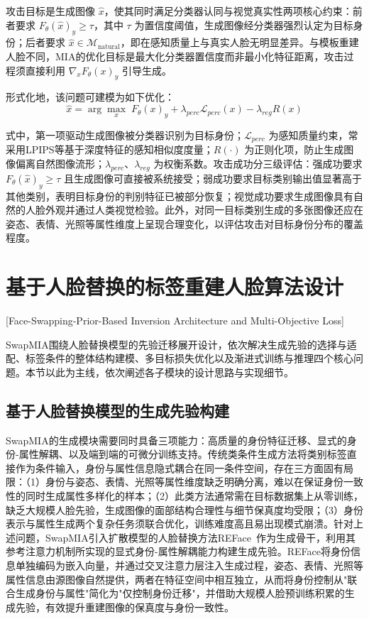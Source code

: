 攻击目标是生成图像 $\hat{x}$，使其同时满足分类器认同与视觉真实性两项核心约束：前者要求 $F_\theta(\hat{x})_y \geq \tau$，其中 $\tau$ 为置信度阈值，生成图像经分类器强烈认定为目标身份；后者要求 $\hat{x} \in \mathcal{M}_{\text{natural}}$，即在感知质量上与真实人脸无明显差异。与模板重建人脸不同，MIA的优化目标是最大化分类器置信度而非最小化特征距离，攻击过程须直接利用 $\nabla_x F_\theta(x)_y$ 引导生成。

形式化地，该问题可建模为如下优化：
\begin{equation}\label{eq:mia_optimization}
\hat{x} = \arg\max_x \; F_\theta(x)_y + \lambda_{perc}\mathcal{L}_{perc}(x) - \lambda_{reg}R(x)
\end{equation}

式中，第一项驱动生成图像被分类器识别为目标身份；$\mathcal{L}_{perc}$ 为感知质量约束，常采用LPIPS\cite{zhang2018unreasonable}等基于深度特征的感知相似度度量；$R(\cdot)$ 为正则化项，防止生成图像偏离自然图像流形；$\lambda_{perc}$、$\lambda_{reg}$ 为权衡系数。攻击成功分三级评估：强成功要求 $F_\theta(\hat{x})_y \geq \tau$ 且生成图像可直接被系统接受；弱成功要求目标类别输出值显著高于其他类别，表明目标身份的判别特征已被部分恢复；视觉成功要求生成图像具有自然的人脸外观并通过人类视觉检验。此外，对同一目标类别生成的多张图像还应在姿态、表情、光照等属性维度上呈现合理变化，以评估攻击对目标身份分布的覆盖程度。

\section{基于人脸替换的标签重建人脸算法设计}[Face-Swapping-Prior-Based Inversion Architecture and Multi-Objective Loss]
\label{sec:mia_architecture}

SwapMIA围绕人脸替换模型的先验迁移展开设计，依次解决生成先验的选择与适配、标签条件的整体结构建模、多目标损失优化以及渐进式训练与推理四个核心问题。本节以此为主线，依次阐述各子模块的设计思路与实现细节。

\subsection{基于人脸替换模型的生成先验构建}

SwapMIA的生成模块需要同时具备三项能力：高质量的身份特征迁移、显式的身份-属性解耦、以及端到端的可微分训练支持。传统类条件生成方法将类别标签直接作为条件输入，身份与属性信息隐式耦合在同一条件空间，存在三方面固有局限：（1）身份与姿态、表情、光照等属性维度缺乏明确分离，难以在保证身份一致性的同时生成属性多样化的样本；（2）此类方法通常需在目标数据集上从零训练，缺乏大规模人脸先验，生成图像的面部结构合理性与细节保真度均受限；（3）身份表示与属性生成两个复杂任务须联合优化，训练难度高且易出现模式崩溃。针对上述问题，SwapMIA引入扩散模型的人脸替换方法REFace~\cite{baliah2025realistic}作为生成骨干，利用其参考注意力机制所实现的显式身份-属性解耦能力构建生成先验。REFace将身份信息单独编码为嵌入向量，并通过交叉注意力层注入生成过程，姿态、表情、光照等属性信息由源图像自然提供，两者在特征空间中相互独立，从而将身份控制从"联合生成身份与属性"简化为"仅控制身份迁移"，并借助大规模人脸预训练积累的生成先验，有效提升重建图像的保真度与身份一致性。

